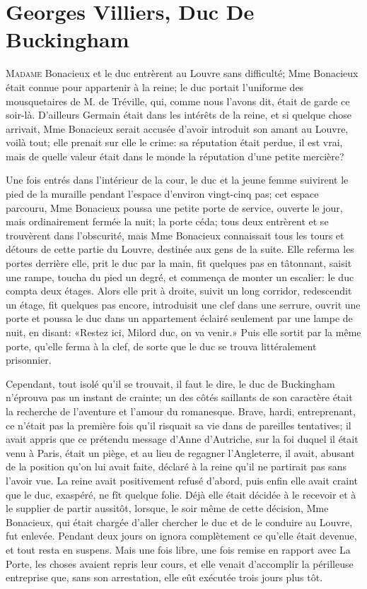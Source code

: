 
\chapter{Georges Villiers, Duc De Buckingham}

\lettrine{M}{adame} Bonacieux et le duc entrèrent au Louvre sans difficulté; Mme Bonacieux était connue pour appartenir à la reine; le duc portait l'uniforme des mousquetaires de M. de Tréville, qui, comme nous l'avons dit, était de garde ce soir-là. D'ailleurs Germain était dans les intérêts de la reine, et si quelque chose arrivait, Mme Bonacieux serait accusée d'avoir introduit son amant au Louvre, voilà tout; elle prenait sur elle le crime: sa réputation était perdue, il est vrai, mais de quelle valeur était dans le monde la réputation d'une petite mercière? 

Une fois entrés dans l'intérieur de la cour, le duc et la jeune femme suivirent le pied de la muraille pendant l'espace d'environ vingt-cinq pas; cet espace parcouru, Mme Bonacieux poussa une petite porte de service, ouverte le jour, mais ordinairement fermée la nuit; la porte céda; tous deux entrèrent et se trouvèrent dans l'obscurité, mais Mme Bonacieux connaissait tous les tours et détours de cette partie du Louvre, destinée aux gens de la suite. Elle referma les portes derrière elle, prit le duc par la main, fit quelques pas en tâtonnant, saisit une rampe, toucha du pied un degré, et commença de monter un escalier: le duc compta deux étages. Alors elle prit à droite, suivit un long corridor, redescendit un étage, fit quelques pas encore, introduisit une clef dans une serrure, ouvrit une porte et poussa le duc dans un appartement éclairé seulement par une lampe de nuit, en disant: «Restez ici, Milord duc, on va venir.» Puis elle sortit par la même porte, qu'elle ferma à la clef, de sorte que le duc se trouva littéralement prisonnier. 

Cependant, tout isolé qu'il se trouvait, il faut le dire, le duc de Buckingham n'éprouva pas un instant de crainte; un des côtés saillants de son caractère était la recherche de l'aventure et l'amour du romanesque. Brave, hardi, entreprenant, ce n'était pas la première fois qu'il risquait sa vie dans de pareilles tentatives; il avait appris que ce prétendu message d'Anne d'Autriche, sur la foi duquel il était venu à Paris, était un piège, et au lieu de regagner l'Angleterre, il avait, abusant de la position qu'on lui avait faite, déclaré à la reine qu'il ne partirait pas sans l'avoir vue. La reine avait positivement refusé d'abord, puis enfin elle avait craint que le duc, exaspéré, ne fît quelque folie. Déjà elle était décidée à le recevoir et à le supplier de partir aussitôt, lorsque, le soir même de cette décision, Mme Bonacieux, qui était chargée d'aller chercher le duc et de le conduire au Louvre, fut enlevée. Pendant deux jours on ignora complètement ce qu'elle était devenue, et tout resta en suspens. Mais une fois libre, une fois remise en rapport avec La Porte, les choses avaient repris leur cours, et elle venait d'accomplir la périlleuse entreprise que, sans son arrestation, elle eût exécutée trois jours plus tôt. 

